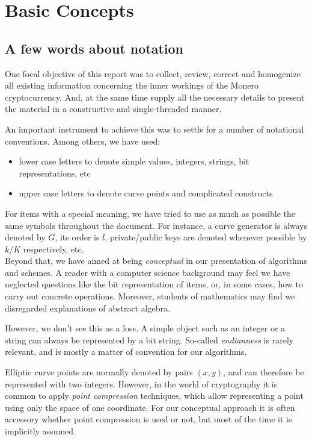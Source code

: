 \chapter{Basic Concepts}
\label{chap:basicConcepts}



\section{A few words about notation}

One focal objective of this report was to collect, review, correct and homogenize all existing information concerning the inner workings of the Monero cryptocurrency. And, at the same time supply all the necessary details to present the material in a constructive and single-threaded manner.

An important instrument to achieve this was to settle for a number of notational conventions. Among others, we have used:

\begin{itemize}
\item lower case letters to denote simple values, integers, strings, bit representations, etc
\item upper case letters to denote curve points and complicated constructs
\end{itemize}

For items with a special meaning, we have tried to use as much as possible the same symbols throughout the document. For instance, a curve generator is always denoted by \(G\), its order is \(l\), private/public keys are denoted whenever possible by \(k/K\) respectively, etc.
\\

Beyond that, we have aimed at being {\em conceptual} in our presentation of algorithms and schemes. A reader with a computer science background may feel we have neglected questions like the bit representation of items, or, in some cases, how to carry out concrete operations. Moreover, students of mathematics may find we disregarded explanations of abstract algebra.

However, we don’t see this as a loss. A simple object such as an integer or a string can always be represented by a bit string. So-called {\em endianness} is rarely relevant, and is mostly a matter of convention for our algorithms. 

Elliptic curve points are normally denoted by pairs \((x, y)\), and can therefore be represented with two integers. However, in the world of cryptography it is common to apply {\em point compression} techniques, which allow representing a point using only the space of one coordinate. For our conceptual approach it is often accessory whether point compression is used or not, but most of the time it is implicitly assumed.\\

